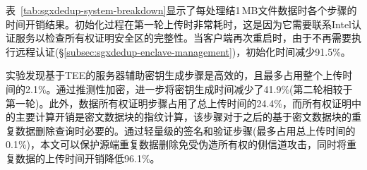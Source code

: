 表~\ref{tab:sgxdedup-system-breakdown}显示了每处理结1\,MB文件数据时各个步骤的时间开销结果。初始化过程在第一轮上传时非常耗时，这是因为它需要联系Intel认证服务以检查所有权证明安全区的完整性。当客户端再次重启时，由于不再需要执行远程认证(\S\ref{subsec:sgxdedup-enclave-management})，初始化时间减少91.5\%。

实验发现基于TEE的服务器辅助密钥生成步骤是高效的，且最多占用整个上传时间的2.1\%。通过推测性加密，\sysnameS 进一步将密钥生成时间减少了41.9\%(第二轮相较于第一轮)。此外，数据所有权证明步骤占用了总上传时间的24.4\%，而所有权证明中的主要计算开销是密文数据块的指纹计算，该步骤对于之后的基于密文数据块的重复数据删除查询时必要的。通过轻量级的签名和验证步骤(最多占用总上传时间的0.1\%)，本文可以保护源端重复数据删除免受伪造所有权的侧信道攻击，同时将重复数据的上传时间开销降低96.1\%。

